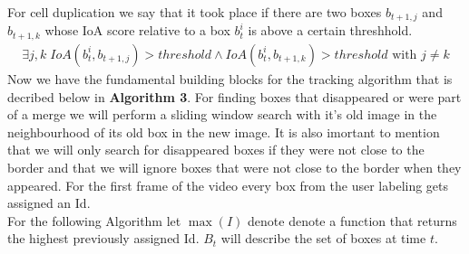 \documentclass{article}
\begin{document}
For cell duplication we say that it took place if there are two boxes $b_{t+1, j}$ and $b_{t+1, k}$ whose IoA score relative to a box $b_{t}^i$ is above a certain threshhold.
\begin{align}
    \exists j, k \; IoA(b_{t}^i, b_{t+1, j}) > threshold \land IoA(b_{t}^i, b_{t+1, k}) > threshold \text{ with } j \neq k
\end{align}
Now we have the fundamental building blocks for the tracking algorithm that is decribed below in \textbf{Algorithm 3}. For finding boxes that disappeared or were
part of a merge we will perform a sliding window search with it's old image in the neighbourhood of its old box in the new image. It is also imortant to mention
that we will only search for disappeared boxes if they were not close to the border and that we will ignore boxes that were not close to the border when they appeared. 
For the first frame of the video every box from the user labeling gets assigned an Id.\medskip\\
\newpage
\noindent For the following Algorithm let $\max(I)$ denote denote a function that returns the highest previously assigned Id. $B_t$ will describe the set of boxes at time $t$.  
\end{document}
